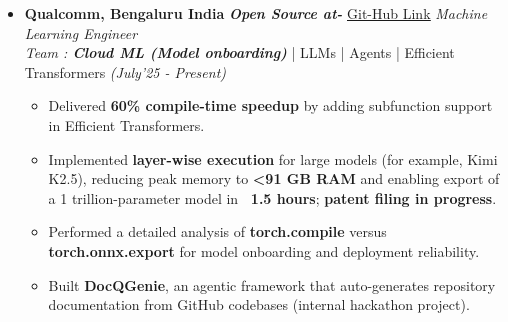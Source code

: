 \documentclass[a4paper,10pt]{article}
\begin{document}
\begin{itemize}[noitemsep,nolistsep]
\item \textbf{Qualcomm, Bengaluru India} \hspace{0.5cm} \textit{\textbf{Open Source at-}} \href{https://github.com/quic/efficient-transformers}{\underline{Git-Hub Link}} \hfill\hfill {\emph{Machine Learning Engineer}}\\ \emph{Team : \textbf{Cloud ML (Model onboarding)}} | LLMs | Agents | Efficient Transformers \hfill
\emph{(July'25 - Present)}
\vspace{0.1cm}
\begin{itemize}[noitemsep,nolistsep]
    \item Delivered \textbf{60\% compile-time speedup} by adding subfunction support in Efficient Transformers.
    \item Implemented \textbf{layer-wise execution} for large models (for example, Kimi K2.5), reducing peak memory to \textbf{<91 GB RAM} and enabling export of a 1 trillion-parameter model in \textbf{~1.5 hours}; \textbf{patent filing in progress}.
    \item Performed a detailed analysis of \textbf{torch.compile} versus \textbf{torch.onnx.export} for model onboarding and deployment reliability.
    \item Built \textbf{DocQGenie}, an agentic framework that auto-generates repository documentation from GitHub codebases (internal hackathon project).
\end{itemize}
\end{itemize}
\vspace{0.2cm}
\end{document}
